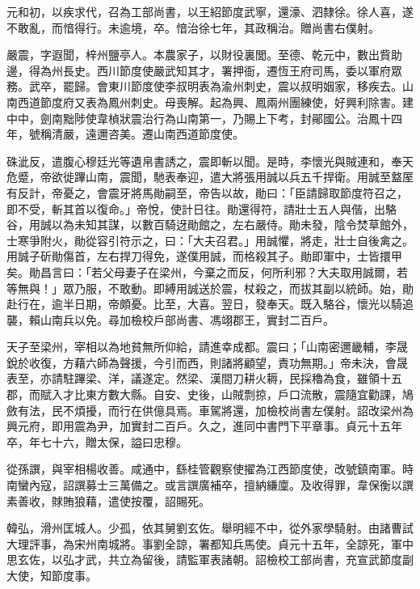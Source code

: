 \begin{pinyinscope}
 元和初，以疾求代，召為工部尚書，以王紹節度武寧，還濠、泗隸徐。徐人喜，遂不敢亂，而愔得行。未逾境，卒。愔治徐七年，其政稱治。贈尚書右僕射。



 嚴震，字遐聞，梓州鹽亭人。本農家子，以財役裏閭。至德、乾元中，數出貲助邊，得為州長史。西川節度使嚴武知其才，署押衙，遷恆王府司馬，委以軍府眾務。武卒，罷歸。會東川節度使李叔明表為渝州刺史，震以叔明姻家，移疾去。山南西道節度府又表為鳳州刺史。母喪解。起為興、鳳兩州團練使，好興利除害。建中中，劍南黜陟使韋楨狀震治行為山南第一，乃賜上下考，封鄖國公。治鳳十四年，號稱清嚴，遠邇咨美。遷山南西道節度使。



 硃泚反，遣腹心穆廷光等遺帛書誘之，震即斬以聞。是時，李懷光與賊連和，奉天危蹙，帝欲徙蹕山南，震聞，馳表奉迎，遣大將張用誠以兵五千捍衛。用誠至盩厔有反計，帝憂之，會震牙將馬勛嗣至，帝告以故，勛曰：「臣請歸取節度符召之，即不受，斬其首以復命。」帝悅，使計日往。勛還得符，請壯士五人與偕，出駱谷，用誠以為未知其謀，以數百騎迓勛館之，左右嚴侍。勛未發，陰令焚草館外，士寒爭附火，勛從容引符示之，曰：「大夫召君。」用誠懼，將走，壯士自後禽之。用誠子斫勛傷首，左右捍刀得免，遂僕用誠，而格殺其子。勛即軍中，士皆擐甲矣。勛昌言曰：「若父母妻子在梁州，今棄之而反，何所利邪？大夫取用誠爾，若等無與！」眾乃服，不敢動。即縛用誠送於震，杖殺之，而拔其副以統師。始，勛赴行在，逾半日期，帝頗憂。比至，大喜。翌日，發奉天。既入駱谷，懷光以騎追襲，賴山南兵以免。尋加檢校戶部尚書、馮翊郡王，實封二百戶。



 天子至梁州，宰相以為地貧無所仰給，請進幸成都。震曰；「山南密邇畿輔，李晟銳於收復，方藉六師為聲援，今引而西，則諸將顧望，責功無期。」帝未決，會晟表至，亦請駐蹕梁、洋，議遂定。然梁、漢間刀耕火耨，民採穭為食，雖領十五郡，而賦入才比東方數大縣。自安、史後，山賊剽掠，戶口流散，震隨宜勸課，鳩斂有法，民不煩擾，而行在供億具焉。車駕將還，加檢校尚書左僕射。詔改梁州為興元府，即用震為尹，加實封二百戶。久之，進同中書門下平章事。貞元十五年卒，年七十六，贈太保，謚曰忠穆。



 從孫譔，與宰相楊收善。咸通中，繇桂管觀察使擢為江西節度使，改號鎮南軍。時南蠻內寇，詔譔募士三萬備之。或言譔廣補卒，擅納縑廩。及收得罪，韋保衡以譔素善收，賕賄狼藉，遣使按覆，詔賜死。



 韓弘，滑州匡城人。少孤，依其舅劉玄佐。舉明經不中，從外家學騎射。由諸曹試大理評事，為宋州南城將。事劉全諒，署都知兵馬使。貞元十五年，全諒死，軍中思玄佐，以弘才武，共立為留後，請監軍表諸朝。詔檢校工部尚書，充宣武節度副大使，知節度事。




\end{pinyinscope}
